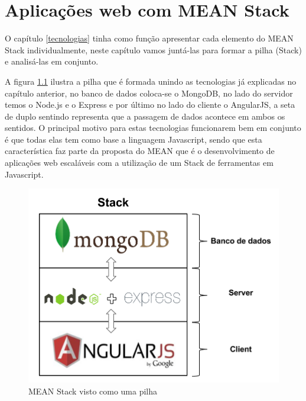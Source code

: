 \chapter{Aplicações web com MEAN Stack}	 
\label{implementacao}


    O capítulo \ref{tecnologias} tinha como função apresentar cada elemento do MEAN Stack individualmente, neste capítulo vamos juntá-las para formar a pilha (Stack) e analisá-las em conjunto.
    
A figura \ref{fig:MEAN Stack visto como uma pilha} ilustra a pilha que é formada unindo as tecnologias já explicadas no capítulo anterior, no banco de dados coloca-se o MongoDB, no lado do servidor temos o Node.js e o Express e por último no lado do cliente o AngularJS, a seta de duplo sentindo representa que a passagem de dados acontece em ambos os sentidos. O principal motivo para estas tecnologias funcionarem bem em conjunto é que todas elas tem como base a linguagem Javascript, sendo que esta característica faz parte da proposta do MEAN que é o desenvolvimento de aplicações web escaláveis com a utilização de um Stack de ferramentas em Javascript.
    
\begin{figure}[htb]
\centering
\includegraphics[scale=0.4]{images/mean_stack_diagram.png}
\caption{MEAN Stack visto como uma pilha}
\label{fig:MEAN Stack visto como uma pilha}
\end{figure}
    
